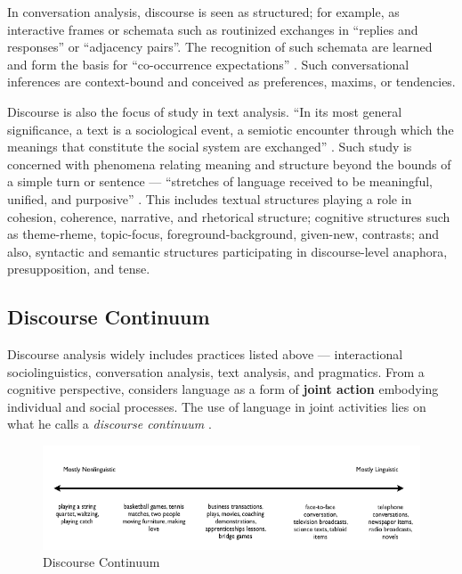 In conversation analysis, discourse is seen as structured; for example, as interactive frames or schemata such as routinized exchanges in  \cite{Goffman:1981tm}  ``replies and responses'' or  \cite*{Sacks:1974uy}  ``adjacency pairs''. The recognition of such schemata are learned and form the basis for ``co-occurrence expectations''  \citep[p. 162]{Gumperz:1982tc}.  Such conversational inferences are context-bound and conceived as preferences, maxims, or tendencies.

Discourse is also the focus of study in text analysis. ``In its most general significance, a text is a sociological event, a semiotic encounter through which the meanings that constitute the social system are exchanged''  \citep[p. 199]{Halliday:1977vj}.  Such study is concerned with phenomena relating meaning and structure beyond the bounds of a simple turn or sentence --- ``stretches of language received to be meaningful, unified, and purposive''  \citep[p. 156]{Cook:1989wu}.  This includes textual structures playing a role in cohesion, coherence, narrative, and rhetorical structure; cognitive structures such as theme-rheme, topic-focus, foreground-background, given-new, contrasts; and also, syntactic and semantic structures participating in discourse-level anaphora, presupposition, and tense.

\subsection{Discourse Continuum}
\label{discoursecontinuum}

Discourse analysis widely includes practices listed above --- interactional sociolinguistics, conversation analysis, text analysis, and pragmatics. From a cognitive perspective,  \cite{Clark:1996tm}  considers language as a form of \textbf{joint action} embodying individual and social processes. The use of language in joint activities lies on what he calls a \emph{discourse continuum}  \citep[\ref{continuum}][p. 50]{Clark:1996tm}.  


\begin{figure}
\centerline{
  \includegraphics[scale=.75]{chapter3.tex/discourse-continuum}
  }
\caption{Discourse Continuum \citep[adapted from][]{Clark:1996tm}}
\label{continuum}
\end{figure}


